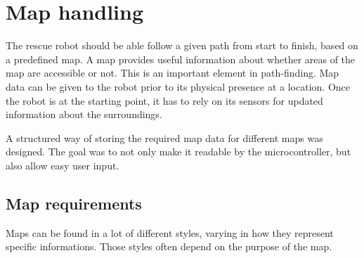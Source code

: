 





\chapter{Map handling}
\label{ch:map} %
The rescue robot should be able follow a given path from start to finish, based on a predefined map.
A map provides useful information about whether areas of the map are accessible or not. This is an important element in path-finding.
Map data can be given to the robot prior to its physical presence at a location. Once the robot is at the starting point, it has to rely on its sensors for updated information about the surroundings.

A structured way of storing the required map data for different maps was designed. 
The goal was to not only make it readable by the microcontroller,
but also allow easy user input.


\newpage
\section{Map requirements}
\label{ch:map_requirements}
Maps can be found in a lot of different styles,
varying in how they represent specific informations.
Those styles often depend on the purpose of the map.

